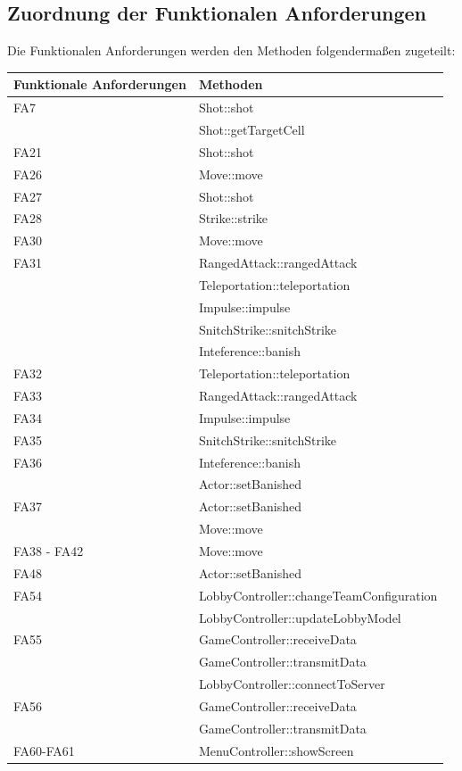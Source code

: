 \subsection{Zuordnung der Funktionalen Anforderungen}
Die Funktionalen Anforderungen werden den Methoden folgendermaßen zugeteilt:
\begin{center}
	\begin{tabular}{|l|l|}
		\hline
		\textbf{Funktionale Anforderungen} & \textbf{Methoden}\\\hline
		FA7 & Shot::shot\\
		& Shot::getTargetCell\\\hline
		FA21 & Shot::shot\\\hline
		FA26 & Move::move\\\hline
		FA27 & Shot::shot\\\hline
		FA28 & Strike::strike\\\hline
		FA30 & Move::move\\\hline
		FA31 & RangedAttack::rangedAttack\\
		& Teleportation::teleportation\\
		& Impulse::impulse\\
		& SnitchStrike::snitchStrike\\
		& Inteference::banish\\\hline
		FA32 & Teleportation::teleportation\\\hline
		FA33 & RangedAttack::rangedAttack\\\hline
		FA34 & Impulse::impulse\\\hline
		FA35 & SnitchStrike::snitchStrike\\\hline
		FA36 & Inteference::banish\\
		& Actor::setBanished\\\hline
		FA37 & Actor::setBanished\\
		& Move::move\\\hline
		FA38 - FA42 & Move::move\\\hline
		FA48 & Actor::setBanished\\\hline
		FA54 & LobbyController::changeTeamConfiguration\\
		& LobbyController::updateLobbyModel\\\hline
		FA55 & GameController::receiveData\\
		& GameController::transmitData\\
		& LobbyController::connectToServer\\\hline
		FA56 & GameController::receiveData\\
		& GameController::transmitData\\\hline
		FA60-FA61 & MenuController::showScreen\\\hline
	\end{tabular}


\end{center}
